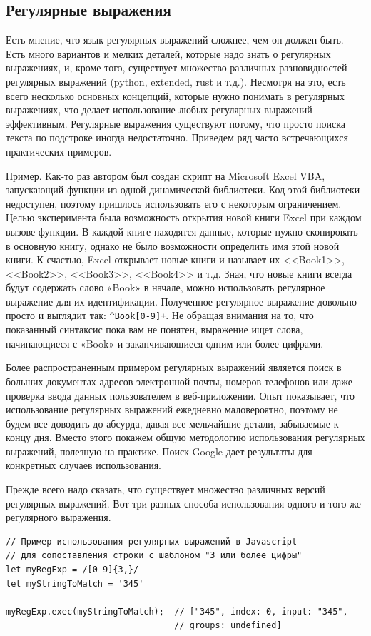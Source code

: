 \documentclass[12pt]{article}
\begin{document}
\hypertarget{Regular-Expressions}{%
\subsection{\texorpdfstring{\protect\hyperlink{Regular-Expressions}{}Регулярные
выражения}{Регулярные выражения}}\label{Regular-Expressions}}

Есть мнение, что язык регулярных выражений сложнее, чем он должен быть.
Есть много вариантов и мелких деталей, которые надо знать о регулярных
выражениях, и, кроме того, существует множество различных разновидностей
регулярных выражений (python, extended, rust и т.д.). Несмотря на это,
есть всего несколько основных концепций, которые нужно понимать в
регулярных выражениях, что делает использование любых регулярных
выражений эффективным.
Регулярные выражения существуют потому, что просто поиска текста по
подстроке иногда недостаточно. Приведем ряд часто встречающихся
практических примеров.

Пример. Как-то раз автором был создан скрипт на Microsoft Excel VBA, запускающий функции из
одной динамической библиотеки. Код этой библиотеки недоступен, поэтому
пришлось использовать его с некоторым ограничением. Целью эксперимента
была возможность открытия новой книги Excel при каждом вызове функции. В
каждой книге находятся данные, которые нужно скопировать в основную
книгу, однако не было возможности определить имя этой новой книги. К
счастью, Excel открывает новые книги и называет их <<Book1>>, <<Book2>>,
<<Book3>>, <<Book4>> и т.д. Зная, что новые книги всегда будут содержать
слово «Book» в начале, можно использовать регулярное выражение для их
идентификации. Полученное регулярное выражение довольно просто и
выглядит так: \verb|^Book[0-9]+|. Не обращая внимания на то,
что показанный синтаксис пока вам не понятен, выражение ищет слова,
начинающиеся с «Book» и заканчивающиеся одним или более цифрами.

Более распространенным примером регулярных выражений является поиск в
больших документах адресов электронной почты, номеров телефонов или
даже проверка ввода данных пользователем в веб-приложении. Опыт показывает, что
использование регулярных выражений ежедневно маловероятно, поэтому не будем
все доводить до абсурда, давая все мельчайшие детали, забываемые к концу дня. Вместо этого
покажем общую методологию использования регулярных выражений, полезную
на практике. Поиск Google дает результаты для конкретных случаев
использования.

Прежде всего надо сказать, что существует множество различных версий
регулярных выражений. Вот три разных способа использования одного и того
же регулярного выражения.
\begin{verbatim}
// Пример использования регулярных выражений в Javascript
// для сопоставления строки с шаблоном "3 или более цифры"
let myRegExp = /[0-9]{3,}/
let myStringToMatch = '345'

myRegExp.exec(myStringToMatch);  // ["345", index: 0, input: "345",
                                 // groups: undefined]
\end{verbatim}
\end{document}
